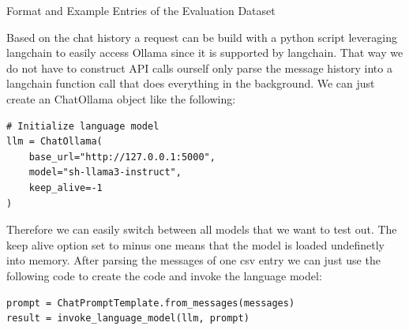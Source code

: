 \begin{table}[htb]
    \centering
    \caption{Format and Example Entries of the Evaluation Dataset}
    \label{tab:dataset-format}
\end{table}
    
Based on the chat history a request can be build with a python script leveraging langchain to easily access Ollama since it is supported by langchain.
That way we do not have to construct API calls ourself only parse the message history into a langchain function call that does everything in the background.
We can just create an ChatOllama object like the following:

\begin{lstlisting}[numbers=none, frame=none]
# Initialize language model
llm = ChatOllama(
    base_url="http://127.0.0.1:5000",
    model="sh-llama3-instruct",
    keep_alive=-1
)
\end{lstlisting}

Therefore we can easily switch between all models that we want to test out. The keep alive option set to minus one means that the model is loaded undefinetly into memory.
After parsing the messages of one csv entry we can just use the following code to create the code and invoke the language model:

\begin{lstlisting}[numbers=none, frame=none]
prompt = ChatPromptTemplate.from_messages(messages)
result = invoke_language_model(llm, prompt)
\end{lstlisting}


